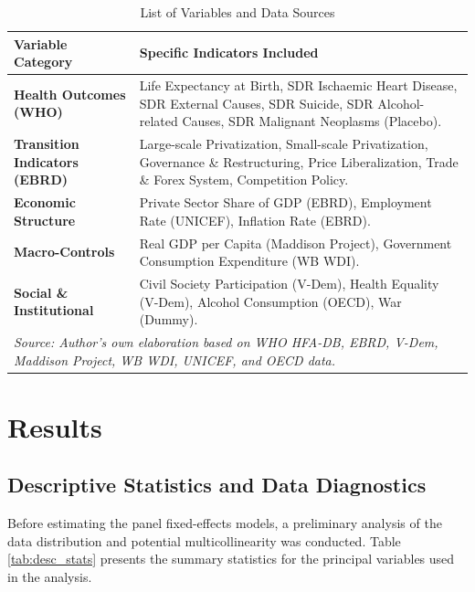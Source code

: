 \documentclass[en,magisterska]{pracamgr}
\begin{document}
\begin{table}[ht]
\centering
\caption{List of Variables and Data Sources}
\label{tab:var_list}
\footnotesize
\begin{tabular}{p{4.5cm} p{8.5cm}}
\toprule
\textbf{Variable Category} & \textbf{Specific Indicators Included} \\
\midrule
\textbf{Health Outcomes (WHO)} & Life Expectancy at Birth, SDR Ischaemic Heart Disease, SDR External Causes, SDR Suicide, SDR Alcohol-related Causes, SDR Malignant Neoplasms (Placebo). \\
\midrule
\textbf{Transition Indicators (EBRD)} & Large-scale Privatization, Small-scale Privatization, Governance \& Restructuring, Price Liberalization, Trade \& Forex System, Competition Policy. \\
\midrule
\textbf{Economic Structure} & Private Sector Share of GDP (EBRD), Employment Rate (UNICEF), Inflation Rate (EBRD). \\
\midrule
\textbf{Macro-Controls} & Real GDP per Capita (Maddison Project), Government Consumption Expenditure (WB WDI). \\
\midrule
\textbf{Social \& Institutional} & Civil Society Participation (V-Dem), Health Equality (V-Dem), Alcohol Consumption (OECD), War (Dummy). \\
\bottomrule
\multicolumn{2}{p{13cm}}{\vspace{2pt}\scriptsize \textit{Source: Author's own elaboration based on WHO HFA-DB, EBRD, V-Dem, Maddison Project, WB WDI, UNICEF, and OECD data.}} \\
\end{tabular}
\end{table}

\section{Results}

\subsection{Descriptive Statistics and Data Diagnostics}

Before estimating the panel fixed-effects models, a preliminary analysis of the data distribution and potential multicollinearity was conducted. 
Table \ref{tab:desc_stats} presents the summary statistics for the principal variables used in the analysis. 
\end{document}
